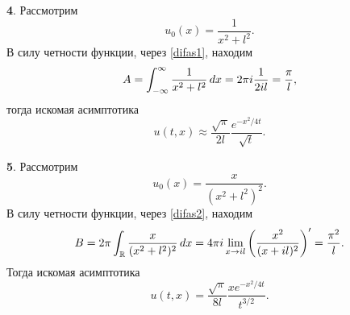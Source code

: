 \textbf{4}. Рассмотрим
\begin{equation*}
    u_0 (x) = \frac{1}{x^2 + l^2}.
\end{equation*}
В силу четности функции, через \eqref{difas1}, находим
\begin{equation*}
    A = \int_{-\infty}^{\infty} \frac{1}{x^2 + l^2} \, d x = 2 \pi i \frac{1}{2 i l} = \frac{\pi}{l},
\end{equation*}
тогда искомая асимптотика
\begin{equation*}
    u(t, x) \approx \frac{\sqrt{\pi}}{2 l} \frac{e^{-x^2 / 4 t}}{\sqrt{t}}.
\end{equation*}

\textbf{5}. Рассмотрим
\begin{equation*}
    u_0 (x) = \frac{x}{(x^2 + l^2)^2}.
\end{equation*}
В силу четности функции, через \eqref{difas2}, находим
\begin{equation*}
    B = 2 \pi \int_{ \mathbb{R}} \frac{x}{(x^2 + l^2)^2} \, d x = 4 \pi i
    \lim_{x \to i l} \left(\frac{x^2}{(x + il)^2}\right)' = \frac{\pi^2}{l}.
\end{equation*}
Тогда искомая асимптотика
\begin{equation*}
    u(t, x) = \frac{\sqrt{\pi}}{8 l} \frac{x e^{-{x^2}/{4 t}}}{t^{3/2}}.
\end{equation*}